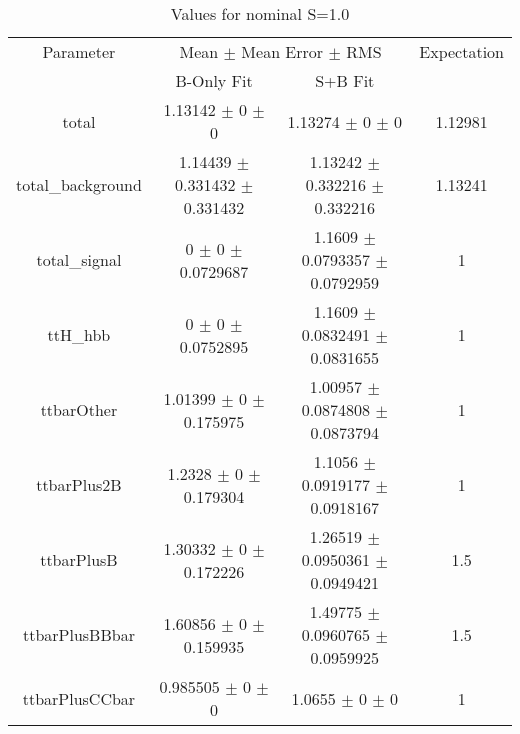 \begin{table}
\centering
\caption{Values for nominal S=1.0}
\begin{tabular}{cccc}
\toprule
Parameter & \multicolumn{2}{c}{Mean $\pm$ Mean Error $\pm$ RMS} & Expectation\\
 & B-Only Fit & S+B Fit & \\
\midrule
total & \num{1.13142} $\pm$ \num{0} $\pm$ \num{0} & \num{1.13274} $\pm$ \num{0} $\pm$ \num{0} & \num{1.12981}\\
total\_background & \num{1.14439} $\pm$ \num{0.331432} $\pm$ \num{0.331432} & \num{1.13242} $\pm$ \num{0.332216} $\pm$ \num{0.332216} & \num{1.13241}\\
total\_signal & \num{0} $\pm$ \num{0} $\pm$ \num{0.0729687} & \num{1.1609} $\pm$ \num{0.0793357} $\pm$ \num{0.0792959} & \num{1}\\
ttH\_hbb & \num{0} $\pm$ \num{0} $\pm$ \num{0.0752895} & \num{1.1609} $\pm$ \num{0.0832491} $\pm$ \num{0.0831655} & \num{1}\\
ttbarOther & \num{1.01399} $\pm$ \num{0} $\pm$ \num{0.175975} & \num{1.00957} $\pm$ \num{0.0874808} $\pm$ \num{0.0873794} & \num{1}\\
ttbarPlus2B & \num{1.2328} $\pm$ \num{0} $\pm$ \num{0.179304} & \num{1.1056} $\pm$ \num{0.0919177} $\pm$ \num{0.0918167} & \num{1}\\
ttbarPlusB & \num{1.30332} $\pm$ \num{0} $\pm$ \num{0.172226} & \num{1.26519} $\pm$ \num{0.0950361} $\pm$ \num{0.0949421} & \num{1.5}\\
ttbarPlusBBbar & \num{1.60856} $\pm$ \num{0} $\pm$ \num{0.159935} & \num{1.49775} $\pm$ \num{0.0960765} $\pm$ \num{0.0959925} & \num{1.5}\\
ttbarPlusCCbar & \num{0.985505} $\pm$ \num{0} $\pm$ \num{0} & \num{1.0655} $\pm$ \num{0} $\pm$ \num{0} & \num{1}\\
\bottomrule
\end{tabular}
\end{table}